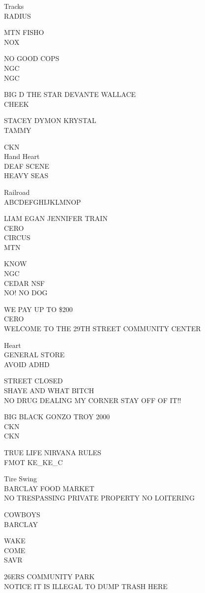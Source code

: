 \documentclass[10pt,letterpaper]{article}
\begin{document}
Tracks\\
RADIUS

MTN FISHO\\
NOX

NO GOOD COPS\\
NGC\\
NGC

BIG D THE STAR DEVANTE WALLACE\\
CHEEK

STACEY DYMON KRYSTAL\\
TAMMY

CKN\\
Hand Heart\\
DEAF SCENE\\
HEAVY SEAS

Railroad\\
ABCDEFGHIJKLMNOP

LIAM EGAN JENNIFER TRAIN\\
CERO\\
CIRCUS\\
MTN

KNOW\\
NGC\\
CEDAR NSF\\
NO! NO DOG

WE PAY UP TO \$200\\
CERO\\
WELCOME TO THE 29TH STREET COMMUNITY CENTER

Heart\\
GENERAL STORE\\
AVOID ADHD

STREET CLOSED\\
SHAYE AND WHAT BITCH\\
NO DRUG DEALING MY CORNER STAY OFF OF IT!!

BIG BLACK GONZO TROY 2000\\
CKN\\
CKN

TRUE LIFE NIRVANA RULES\\
FMOT KE\_KE\_C

Tire Swing\\
BARCLAY FOOD MARKET\\
NO TRESPASSING PRIVATE PROPERTY NO LOITERING

COWBOYS\\
BARCLAY

WAKE\\
COME\\
SAVR

26ERS COMMUNITY PARK\\
NOTICE IT IS ILLEGAL TO DUMP TRASH HERE
\end{document}
